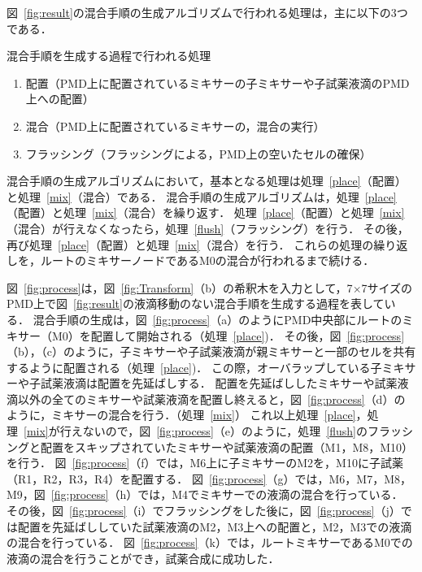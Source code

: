 \newpage
図~\ref{fig:result}の混合手順の生成アルゴリズムで行われる処理は，主に以下の3つである．
\begin{itembox}[l]{混合手順を生成する過程で行われる処理}
\begin{enumerate}
    \item 配置（PMD上に配置されているミキサーの子ミキサーや子試薬液滴のPMD上への配置）\label{place}
    \item 混合（PMD上に配置されているミキサーの，混合の実行）\label{mix}
    \item フラッシング（フラッシングによる，PMD上の空いたセルの確保）\label{flush}
\end{enumerate}
\end{itembox}

混合手順の生成アルゴリズムにおいて，基本となる処理は処理~\ref{place}（配置）と処理~\ref{mix}（混合）である．
混合手順の生成アルゴリズムは，処理~\ref{place}（配置）と処理~\ref{mix}（混合）を繰り返す．
処理~\ref{place}（配置）と処理~\ref{mix}（混合）が行えなくなったら，処理~\ref{flush}（フラッシング）を行う．
その後，再び処理~\ref{place}（配置）と処理~\ref{mix}（混合）を行う．
これらの処理の繰り返しを，ルートのミキサーノードであるM0の混合が行われるまで続ける．

\newpage

図~\ref{fig:process}は，図~\ref{fig:Transform}（b）の希釈木を入力として，7$\times$7サイズのPMD上で図~\ref{fig:result}の液滴移動のない混合手順を生成する過程を表している．
混合手順の生成は，図~\ref{fig:process}（a）のようにPMD中央部にルートのミキサー（M0）を配置して開始される（処理~\ref{place})．
その後，図~\ref{fig:process}（b），（c）のように，子ミキサーや子試薬液滴が親ミキサーと一部のセルを共有するように配置される（処理~\ref{place})．
この際，オーバラップしている子ミキサーや子試薬液滴は配置を先延ばしする． 配置を先延ばししたミキサーや試薬液滴以外の全てのミキサーや試薬液滴を配置し終えると，図~\ref{fig:process}（d）のように，ミキサーの混合を行う．（処理~\ref{mix}） 
これ以上処理~\ref{place}，処理~\ref{mix}が行えないので，図~\ref{fig:process}（e）のように，処理~\ref{flush}のフラッシングと配置をスキップされていたミキサーや試薬液滴の配置（M1，M8，M10）を行う．
図~\ref{fig:process}（f）では，M6上に子ミキサーのM2を，M10に子試薬（R1，R2，R3，R4）を配置する．
図~\ref{fig:process}（g）では，M6，M7，M8，M9，図~\ref{fig:process}（h）では，M4でミキサーでの液滴の混合を行っている．
その後，図~\ref{fig:process}（i）でフラッシングをした後に，図~\ref{fig:process}（j）では配置を先延ばししていた試薬液滴のM2，M3上への配置と，M2，M3での液滴の混合を行っている．
図~\ref{fig:process}（k）では，ルートミキサーであるM0での液滴の混合を行うことができ，試薬合成に成功した．

